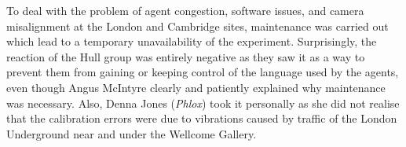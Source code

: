 \enlargethispage{1\baselineskip}
To deal with the problem of agent congestion, software issues, and camera misalignment at the London 
and Cambridge sites, maintenance was carried out which lead to a temporary unavailability of the experiment. 
Surprisingly, the reaction of the Hull group was entirely negative as they saw it as a 
way to prevent them from gaining or keeping control of the language used by the agents, even though 
Angus McIntyre clearly and patiently explained why maintenance was necessary. Also, Denna Jones ({\it Phlox}) took 
it personally as she did not realise that the calibration errors were due to vibrations caused by
traffic of the London Underground near and under the Wellcome Gallery.


